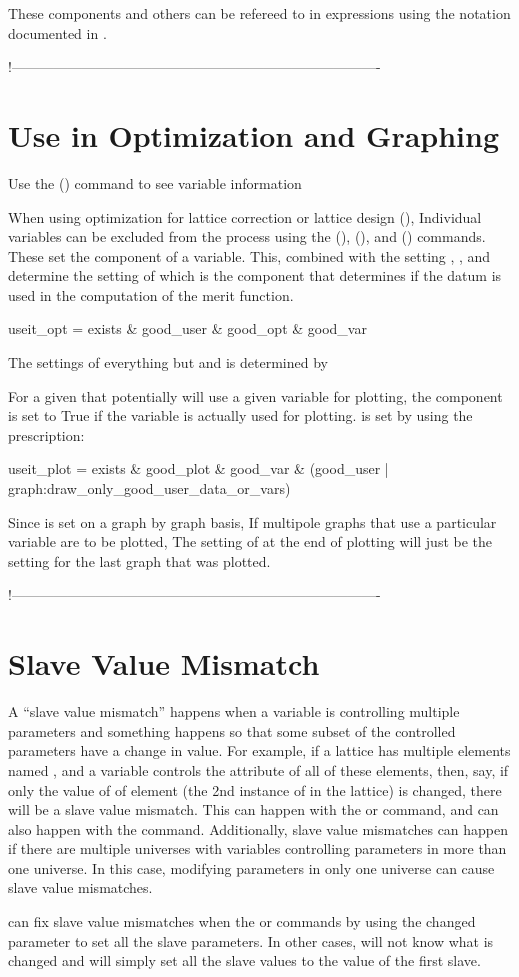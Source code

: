 These components and others can be refereed to in expressions using the notation documented
in .

!-------------------------------------------------------------------------------
\section{Use in Optimization and Graphing}
\label{s:var.use}

Use the  () command to see variable information

When using optimization for lattice correction or lattice design (), Individual
variables can be excluded from the process using the  (), 
(), and  () commands. These set the  component of
a variable. This, combined with the setting , , and  determine
the setting of  which is the component that determines if the datum is used in the
computation of the merit function.
\begin{example}
  useit_opt = exists \& good_user \& good_opt \& good_var
\end{example}
The settings of everything but  and  is determined by \tao

For a given  that potentially will use a given variable for plotting, 
the  component is set to True if the variable is actually used for plotting.
 is set by \tao using the prescription:
\begin{example}
  useit_plot = exists \& good_plot \& good_var \& 
                            (good_user | graph:draw_only_good_user_data_or_vars)
\end{example}
Since  is set on a graph by graph basis, If multipole graphs that use a particular
variable are to be plotted, The setting of  at the end of plotting will just be
the setting for the last graph that was plotted.

!-------------------------------------------------------------------------------
\section{Slave Value Mismatch}
\label{s:var.mismatch}

A ``slave value mismatch'' happens when a variable is controlling multiple parameters and something
happens so that some subset of the controlled parameters have a change in value. For example, if a
lattice has multiple elements named , and a variable controls the  attribute of all
of these elements, then, say, if only the value of  of element  (the 2nd instance
of  in the lattice) is changed, there will be a slave value mismatch. This can happen with the
 or  command, and can also happen with the 
command.  Additionally, slave value mismatches can happen if there are multiple universes with
variables controlling parameters in more than one universe. In this case, modifying parameters in
only one universe can cause slave value mismatches.

\tao can fix slave value mismatches when the  or  commands by using
the changed parameter to set all the slave parameters. In other cases, \tao will not know what is changed
and will simply set all the slave values to the value of the first slave.
